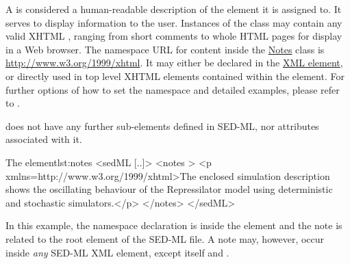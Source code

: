 \label{class:notes}

A  is considered a  human-readable description of the element it is assigned to. It serves to display information to the user. 
Instances of the  class may contain any valid XHTML \citep{P+02}, ranging from short comments to whole HTML pages for display in a Web browser. 
The namespace URL for  content inside the \hyperref[class:notes]{Notes} class is \url{http://www.w3.org/1999/xhtml}. It may either be declared in the \hyperref[class:sed-ml]{ XML element}, or directly used in top level XHTML elements contained within the   element. For further options of how to set the namespace and detailed examples, please refer to \citep[p. 14]{HBH+10}.

  does not have any further sub-elements defined in SED-ML, nor attributes associated with it.
%

%
\begin{myXmlLst}{The  element}{lst:notes}
<sedML [..]>
 <notes >
  <p xmlns=http://www.w3.org/1999/xhtml>The enclosed simulation description shows the oscillating behaviour of 
     the Repressilator model using deterministic and stochastic simulators.</p>
 </notes>
</sedML>
\end{myXmlLst}
%
In this example, the namespace declaration is inside the  element and the note is related to the  root element of the SED-ML file. A note may, however, occur inside \emph{any} SED-ML XML element, except  itself and \hyperref[class:annotation]{}.


